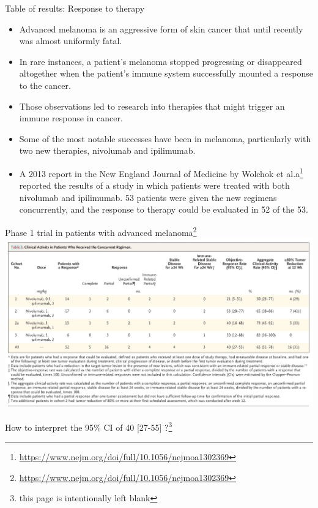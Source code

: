 \documentclass[10pt]{beamer}\usepackage[]{graphicx}\usepackage[]{color}
\begin{document}
\begin{frame}{Table of results: Response to therapy}
\begin{itemize}
	\item Advanced melanoma is an aggressive form of skin cancer that until recently was almost uniformly fatal. 
	\item In rare instances, a patient's melanoma stopped progressing or disappeared altogether when the patient's immune system successfully mounted a response to the cancer. 
	\item Those observations led to research into therapies that might trigger an immune response in cancer. 
	\item Some of the	most notable successes have been in melanoma, particularly with two new therapies, nivolumab
	and ipilimumab. \pause 
	\item A 2013 report in the New England Journal of Medicine by Wolchok et al.a\footnote{\tiny \url{https://www.nejm.org/doi/full/10.1056/nejmoa1302369}} reported the results
	of a study in which patients were treated with both nivolumab and ipilimumab. 53 patients were given the new regimens concurrently, and the response to therapy could be evaluated in 52 of the 53.
\end{itemize}
\end{frame}

\begin{frame}{Phase 1 trial in patients with advanced melanoma\footnote{\tiny \url{https://www.nejm.org/doi/full/10.1056/nejmoa1302369}}}
	\centering
	\includegraphics[scale=0.25]{wolchok2.png}
\end{frame}

\begin{frame}{How to interpret the 95\% CI of 40 [27-55] ?\footnote{\tiny this page is intentionally left blank}}
	
\end{frame}
\end{document}
